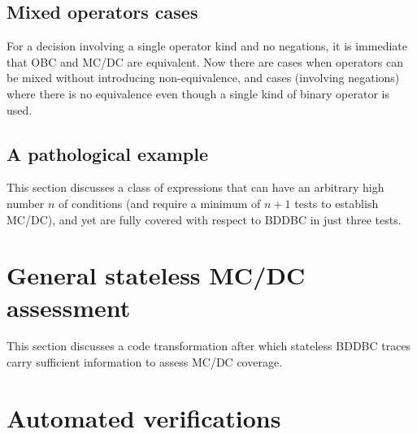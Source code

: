 \documentclass[a4paper,12pt,twoside]{article}
\begin{document}
\subsection{Mixed operators cases}

For a decision involving a single operator kind and no negations, it is
immediate that OBC and MC/DC are equivalent. Now there are cases when
operators can be mixed without introducing non-equivalence, and cases
(involving negations) where there is no equivalence even though a single
kind of binary operator is used.

\subsection{A pathological example}

This section discusses a class of expressions that can have an arbitrary
high number $n$ of conditions (and require a minimum of $n+1$ tests to
establish MC/DC), and yet are fully covered with respect to BDDBC in
just three tests.

\section{General stateless MC/DC assessment}

This section discusses a code transformation after which stateless BDDBC
traces carry sufficient information to assess MC/DC coverage.

\section{Automated verifications}

\newpage


\end{document}
